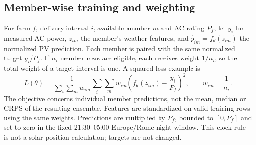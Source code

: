 \documentclass[11pt,a4paper]{article}
\begin{document}
\subsection{Member-wise training and weighting}
For farm $f$, delivery interval $i$, available member $m$ and AC rating $P_f$, let $y_i$ be measured AC power, $z_{im}$ the member's weather features, and $\widehat p_{im}=f_{\theta}(z_{im})$ the normalized PV prediction. Each member is paired with the same normalized target $y_i/P_f$. If $n_i$ member rows are eligible, each receives weight $1/n_i$, so the total weight of a target interval is one. A squared-loss example is
\begin{equation}
 L(\theta)=\frac{1}{\sum_i\sum_m w_{im}}\sum_i\sum_m w_{im}\left(f_{\theta}(z_{im})-\frac{y_i}{P_f}\right)^2,\qquad w_{im}=\frac{1}{n_i}.
\end{equation}
The objective concerns individual member predictions, not the mean, median or CRPS of the resulting ensemble. Features are standardized on valid training rows using the same weights. Predictions are multiplied by $P_f$, bounded to $[0,P_f]$ and set to zero in the fixed 21:30--05:00 Europe/Rome night window. This clock rule is not a solar-position calculation; targets are not changed.
\end{document}
